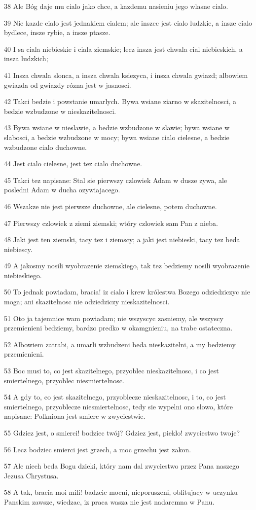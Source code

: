 \par 38 Ale Bóg daje mu cialo jako chce, a kazdemu nasieniu jego wlasne cialo.
\par 39 Nie kazde cialo jest jednakiem cialem; ale inszec jest cialo ludzkie, a insze cialo bydlece, insze rybie, a insze ptasze.
\par 40 I sa ciala niebieskie i ciala ziemskie; lecz insza jest chwala cial niebieskich, a insza ludzkich;
\par 41 Insza chwala slonca, a insza chwala ksiezyca, i insza chwala gwiazd; albowiem gwiazda od gwiazdy rózna jest w jasnosci.
\par 42 Takci bedzie i powstanie umarlych. Bywa wsiane ziarno w skazitelnosci, a bedzie wzbudzone w nieskazitelnosci.
\par 43 Bywa wsiane w nieslawie, a bedzie wzbudzone w slawie; bywa wsiane w slabosci, a bedzie wzbudzone w mocy; bywa wsiane cialo cielesne, a bedzie wzbudzone cialo duchowne.
\par 44 Jest cialo cielesne, jest tez cialo duchowne.
\par 45 Takci tez napisane: Stal sie pierwszy czlowiek Adam w dusze zywa, ale posledni Adam w ducha ozywiajacego.
\par 46 Wszakze nie jest pierwsze duchowne, ale cielesne, potem duchowne.
\par 47 Pierwszy czlowiek z ziemi ziemski; wtóry czlowiek sam Pan z nieba.
\par 48 Jaki jest ten ziemski, tacy tez i ziemscy; a jaki jest niebieski, tacy tez beda niebiescy.
\par 49 A jakosmy nosili wyobrazenie ziemskiego, tak tez bedziemy nosili wyobrazenie niebieskiego.
\par 50 To jednak powiadam, bracia! iz cialo i krew królestwa Bozego odziedziczyc nie moga; ani skazitelnosc nie odziedziczy nieskazitelnosci.
\par 51 Oto ja tajemnice wam powiadam; nie wszyscyc zasniemy, ale wszyscy przemienieni bedziemy, bardzo predko w okamgnieniu, na trabe ostateczna.
\par 52 Albowiem zatrabi, a umarli wzbudzeni beda nieskazitelni, a my bedziemy przemienieni.
\par 53 Boc musi to, co jest skazitelnego, przyoblec nieskazitelnosc, i co jest smiertelnego, przyoblec niesmiertelnosc.
\par 54 A gdy to, co jest skazitelnego, przyoblecze nieskazitelnosc, i to, co jest smiertelnego, przyoblecze niesmiertelnosc, tedy sie wypelni ono slowo, które napisane: Polkniona jest smierc w zwyciestwie.
\par 55 Gdziez jest, o smierci! bodziec twój? Gdziez jest, pieklo! zwyciestwo twoje?
\par 56 Lecz bodziec smierci jest grzech, a moc grzechu jest zakon.
\par 57 Ale niech beda Bogu dzieki, który nam dal zwyciestwo przez Pana naszego Jezusa Chrystusa.
\par 58 A tak, bracia moi mili! badzcie mocni, nieporuszeni, obfitujacy w uczynku Panskim zawsze, wiedzac, iz praca wasza nie jest nadaremna w Panu.

